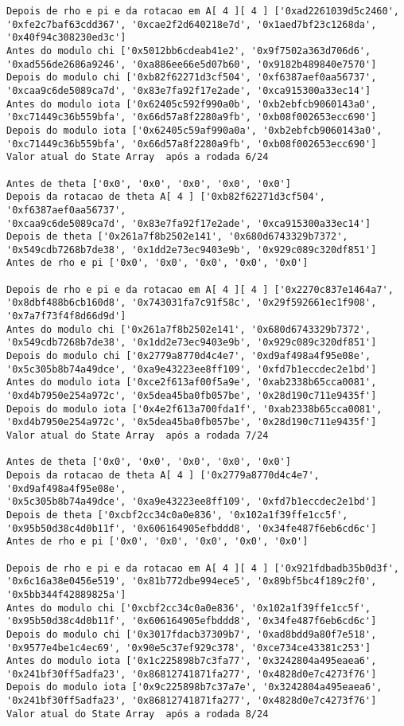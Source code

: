 \documentclass[12pt, a4paper]{article}
\begin{document}
\begin{enumerate}
\begin{enumerate}
\begin{verbatim}
Depois de rho e pi e da rotacao em A[ 4 ][ 4 ] ['0xad2261039d5c2460',
'0xfe2c7baf63cdd367', '0xcae2f2d640218e7d', '0x1aed7bf23c1268da',
'0x40f94c308230ed3c']
Antes do modulo chi ['0x5012bb6cdeab41e2', '0x9f7502a363d706d6',
'0xad556de2686a9246', '0xa886ee66e5d07b60', '0x9182b489840e7570']
Depois do modulo chi ['0xb82f62271d3cf504', '0xf6387aef0aa56737',
'0xcaa9c6de5089ca7d', '0x83e7fa92f17e2ade', '0xca915300a33ec14']
Antes do modulo iota ['0x62405c592f990a0b', '0xb2ebfcb9060143a0',
'0xc71449c36b559bfa', '0x66d57a8f2280a9fb', '0xb08f002653ecc690']
Depois do modulo iota ['0x62405c59af990a0a', '0xb2ebfcb9060143a0',
'0xc71449c36b559bfa', '0x66d57a8f2280a9fb', '0xb08f002653ecc690']
Valor atual do State Array  após a rodada 6/24

Antes de theta ['0x0', '0x0', '0x0', '0x0', '0x0']
Depois da rotacao de theta A[ 4 ] ['0xb82f62271d3cf504', '0xf6387aef0aa56737',
'0xcaa9c6de5089ca7d', '0x83e7fa92f17e2ade', '0xca915300a33ec14']
Depois de theta ['0x261a7f8b2502e141', '0x680d6743329b7372',
'0x549cdb7268b7de38', '0x1dd2e73ec9403e9b', '0x929c089c320df851']
Antes de rho e pi ['0x0', '0x0', '0x0', '0x0', '0x0']

Depois de rho e pi e da rotacao em A[ 4 ][ 4 ] ['0x2270c837e1464a7',
'0x8dbf488b6cb160d8', '0x743031fa7c91f58c', '0x29f592661ec1f908',
'0x7a7f73f4f8d66d9d']
Antes do modulo chi ['0x261a7f8b2502e141', '0x680d6743329b7372',
'0x549cdb7268b7de38', '0x1dd2e73ec9403e9b', '0x929c089c320df851']
Depois do modulo chi ['0x2779a8770d4c4e7', '0xd9af498a4f95e08e',
'0x5c305b8b74a49dce', '0xa9e43223ee8ff109', '0xfd7b1eccdec2e1bd']
Antes do modulo iota ['0xce2f613af00f5a9e', '0xab2338b65cca0081',
'0xd4b7950e254a972c', '0x5dea45ba0fb057be', '0x28d190c711e9435f']
Depois do modulo iota ['0x4e2f613a700fda1f', '0xab2338b65cca0081',
'0xd4b7950e254a972c', '0x5dea45ba0fb057be', '0x28d190c711e9435f']
Valor atual do State Array  após a rodada 7/24

Antes de theta ['0x0', '0x0', '0x0', '0x0', '0x0']
Depois da rotacao de theta A[ 4 ] ['0x2779a8770d4c4e7', '0xd9af498a4f95e08e',
'0x5c305b8b74a49dce', '0xa9e43223ee8ff109', '0xfd7b1eccdec2e1bd']
Depois de theta ['0xcbf2cc34c0a0e836', '0x102a1f39ffe1cc5f',
'0x95b50d38c4d0b11f', '0x606164905efbddd8', '0x34fe487f6eb6cd6c']
Antes de rho e pi ['0x0', '0x0', '0x0', '0x0', '0x0']

Depois de rho e pi e da rotacao em A[ 4 ][ 4 ] ['0x921fdbadb35b0d3f',
'0x6c16a38e0456e519', '0x81b772dbe994ece5', '0x89bf5bc4f189c2f0',
'0x5bb344f42889825a']
Antes do modulo chi ['0xcbf2cc34c0a0e836', '0x102a1f39ffe1cc5f',
'0x95b50d38c4d0b11f', '0x606164905efbddd8', '0x34fe487f6eb6cd6c']
Depois do modulo chi ['0x3017fdacb37309b7', '0xad8bdd9a80f7e518',
'0x9577e4be1c4ec69', '0x90e5c37ef929c378', '0xce734ce43381c253']
Antes do modulo iota ['0x1c225898b7c3fa77', '0x3242804a495eaea6',
'0x241bf30ff5adfa23', '0x86812741871fa277', '0x4828d0e7c4273f76']
Depois do modulo iota ['0x9c225898b7c37a7e', '0x3242804a495eaea6',
'0x241bf30ff5adfa23', '0x86812741871fa277', '0x4828d0e7c4273f76']
Valor atual do State Array  após a rodada 8/24


\end{verbatim}
\end{enumerate}
\end{enumerate}
\end{document}
